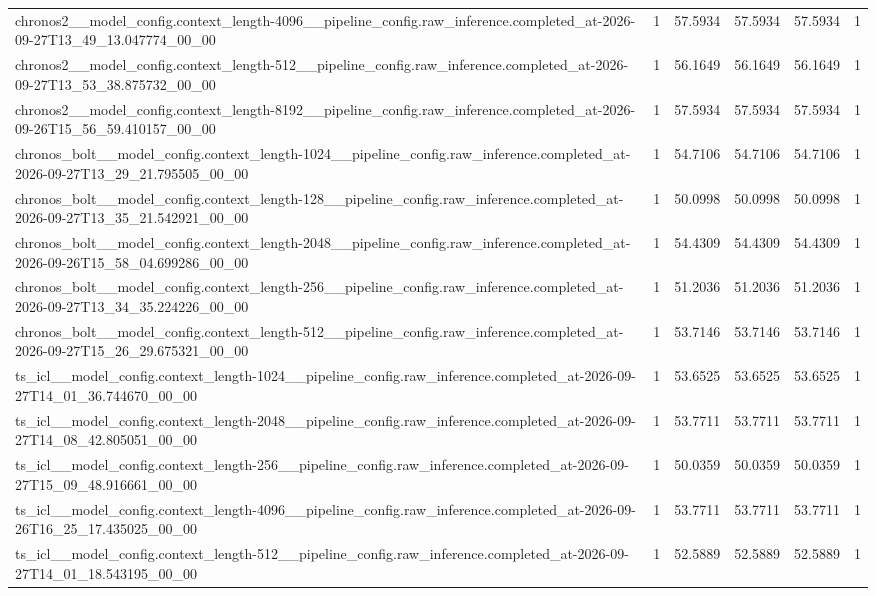 \begin{tabular}{llllll}
chronos2\_\_model\_config.context\_length-4096\_\_pipeline\_config.raw\_inference.completed\_at-2026-09-27T13\_49\_13.047774\_00\_00 & 1 & 57.5934 & 57.5934 & 57.5934 & 1 \\
chronos2\_\_model\_config.context\_length-512\_\_pipeline\_config.raw\_inference.completed\_at-2026-09-27T13\_53\_38.875732\_00\_00 & 1 & 56.1649 & 56.1649 & 56.1649 & 1 \\
chronos2\_\_model\_config.context\_length-8192\_\_pipeline\_config.raw\_inference.completed\_at-2026-09-26T15\_56\_59.410157\_00\_00 & 1 & 57.5934 & 57.5934 & 57.5934 & 1 \\
chronos\_bolt\_\_model\_config.context\_length-1024\_\_pipeline\_config.raw\_inference.completed\_at-2026-09-27T13\_29\_21.795505\_00\_00 & 1 & 54.7106 & 54.7106 & 54.7106 & 1 \\
chronos\_bolt\_\_model\_config.context\_length-128\_\_pipeline\_config.raw\_inference.completed\_at-2026-09-27T13\_35\_21.542921\_00\_00 & 1 & 50.0998 & 50.0998 & 50.0998 & 1 \\
chronos\_bolt\_\_model\_config.context\_length-2048\_\_pipeline\_config.raw\_inference.completed\_at-2026-09-26T15\_58\_04.699286\_00\_00 & 1 & 54.4309 & 54.4309 & 54.4309 & 1 \\
chronos\_bolt\_\_model\_config.context\_length-256\_\_pipeline\_config.raw\_inference.completed\_at-2026-09-27T13\_34\_35.224226\_00\_00 & 1 & 51.2036 & 51.2036 & 51.2036 & 1 \\
chronos\_bolt\_\_model\_config.context\_length-512\_\_pipeline\_config.raw\_inference.completed\_at-2026-09-27T15\_26\_29.675321\_00\_00 & 1 & 53.7146 & 53.7146 & 53.7146 & 1 \\
ts\_icl\_\_model\_config.context\_length-1024\_\_pipeline\_config.raw\_inference.completed\_at-2026-09-27T14\_01\_36.744670\_00\_00 & 1 & 53.6525 & 53.6525 & 53.6525 & 1 \\
ts\_icl\_\_model\_config.context\_length-2048\_\_pipeline\_config.raw\_inference.completed\_at-2026-09-27T14\_08\_42.805051\_00\_00 & 1 & 53.7711 & 53.7711 & 53.7711 & 1 \\
ts\_icl\_\_model\_config.context\_length-256\_\_pipeline\_config.raw\_inference.completed\_at-2026-09-27T15\_09\_48.916661\_00\_00 & 1 & 50.0359 & 50.0359 & 50.0359 & 1 \\
ts\_icl\_\_model\_config.context\_length-4096\_\_pipeline\_config.raw\_inference.completed\_at-2026-09-26T16\_25\_17.435025\_00\_00 & 1 & 53.7711 & 53.7711 & 53.7711 & 1 \\
ts\_icl\_\_model\_config.context\_length-512\_\_pipeline\_config.raw\_inference.completed\_at-2026-09-27T14\_01\_18.543195\_00\_00 & 1 & 52.5889 & 52.5889 & 52.5889 & 1 \\

\end{tabular}

